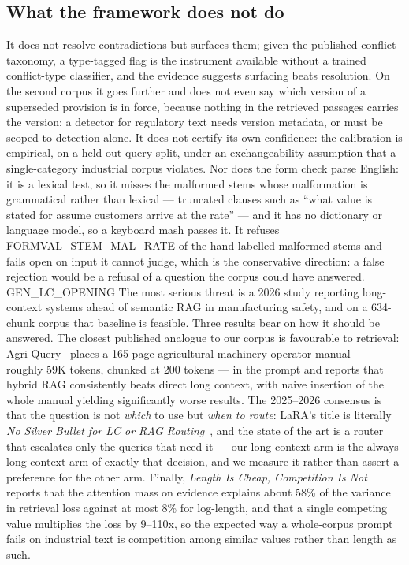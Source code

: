 \documentclass[preprint,3p,times]{elsarticle}
\begin{document}
\subsection{What the framework does not do}

It does not resolve contradictions but surfaces them; given the published
conflict taxonomy, a type-tagged flag is the instrument available without a
trained conflict-type classifier, and the evidence suggests surfacing beats
resolution. On the second corpus it goes further and does not even say which
version of a superseded provision is in force, because nothing in the
retrieved passages carries the version: a detector for regulatory text needs
version metadata, or must be scoped to detection alone. It does not certify
its own confidence: the calibration is
empirical, on a held-out query split, under an exchangeability assumption that
a single-category industrial corpus violates. Nor does the form check parse
English: it is a lexical test, so it misses the malformed stems whose
malformation is grammatical rather than lexical --- truncated clauses such as
``what value is stated for assume customers arrive at the rate'' --- and it has
no dictionary or language model, so a keyboard mash passes it. It refuses
{{FORMVAL_STEM_MAL_RATE}} of the hand-labelled malformed stems and fails open
on input it cannot judge, which is the conservative direction: a false
rejection would be a refusal of a question the corpus could have answered.
{{GEN_LC_OPENING}} The most
serious threat is a 2026 study reporting long-context systems ahead of semantic
RAG in manufacturing safety, and on a 634-chunk corpus that baseline is
feasible. Three results bear on how it should be answered. The closest
published analogue to our corpus is favourable to retrieval:
Agri-Query~\cite{chen2026agriquery} places a 165-page agricultural-machinery
operator manual --- roughly 59K tokens, chunked at 200 tokens --- in the prompt
and reports that hybrid RAG consistently beats direct long context, with naive
insertion of the whole manual yielding significantly worse results. The
2025--2026 consensus is that the question is not \emph{which} to use but
\emph{when to route}: LaRA's title is literally \emph{No Silver Bullet for LC
or RAG Routing}~\cite{lu2025lara}, and the state of the art is a router that
escalates only the queries that need it --- our long-context arm is the
always-long-context arm of exactly that decision, and we measure it rather
than assert a preference for the other arm. Finally, \emph{Length Is Cheap,
Competition Is Not}~\cite{liu2026lengthcheap} reports that the attention mass
on evidence explains about 58\% of the variance in retrieval loss against at
most 8\% for log-length, and that a single competing value multiplies the loss
by 9--110x, so the expected way a whole-corpus prompt fails on industrial text
is competition among similar values rather than length as such.
\end{document}
